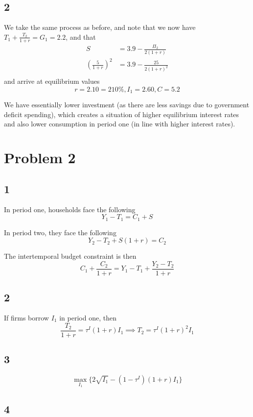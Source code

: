 \documentclass[12pt,letterpaper]{article}
\theoremstyle{definition}
\begin{document}
\subsection*{2}

We take the same process as before, and note that we now have $T_1 +
\frac{T_2}{1+r} = G_1 = 2.2$, and that
\begin{align*}
  S &= 3.9 - \frac{\Pi_2}{2(1 + r)} \\
  \left(\frac{5}{1+r}\right)^2 &= 3.9 - \frac{25}{2(1+r)^2} \\
\end{align*}
and arrive at equilibrium values
\[
  r = 2.10 = 210\%, I_1 = 2.60, C = 5.2
\]

We have essentially lower investment (as there are less savings due to government
deficit spending), which creates a situation of higher equilibrium interest
rates and also lower consumption in period one (in line with higher interest rates).

\section*{Problem 2}

\subsection*{1}

In period one, households face the following
\[
  Y_1 - T_1 = C_1 + S 
\]

In period two, they face the following
\[
  Y_2 - T_2 + S(1 + r) = C_2 
\]

The intertemporal budget constraint is then
\[
  C_1 + \frac{C_2}{1 + r} = Y_1 - T_1 + \frac{Y_2 - T_2}{1 + r}
\]

\subsection*{2}

If firms borrow $I_1$ in period one, then
\[
  \frac{T_2}{1 + r} = \tau^I(1 + r)I_1 \implies T_2 = \tau^I(1 + r)^2I_1 
\]

\subsection*{3}

\[
  \max_{I_1}\{2\sqrt{I_1} - (1 - \tau^I)(1 + r)I_1\}
\]

\subsection*{4}
\end{document}
